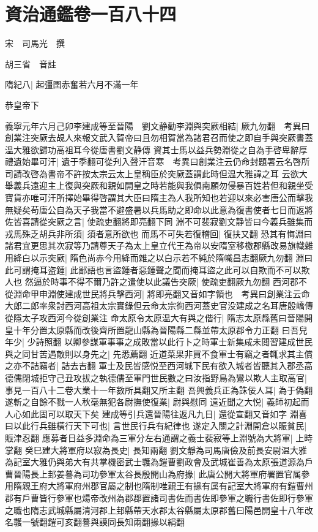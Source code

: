 \chapter{資治通鑑卷一百八十四}
宋　司馬光　撰

胡三省　音註

隋紀八|{
	起彊圉赤奮若六月不滿一年}


恭皇帝下

義寧元年六月己卯李建成等至晉陽　劉文静勸李淵與突厥相結|{
	厥九勿翻　考異曰創業注突厥去覘人來報文武入賀帝曰且勿相賀當為諸君召而使之即自手與突厥書蓋温大雅欲歸功高祖耳今從唐書劉文静傳}
資其士馬以益兵勢淵從之自為手啓卑辭厚禮遺始畢可汗|{
	遺于季翻可從刋入聲汗音寒　考異曰創業注云仍命封題署云名啓所司請改啓為書帝不許按太宗云太上皇稱臣於突厥蓋謂此時但温大雅諱之耳}
云欲大舉義兵遠迎主上復與突厥和親如開皇之時若能與我俱南願勿侵暴百姓若但和親坐受寶貨亦唯可汗所擇始畢得啓謂其大臣曰隋主為人我所知也若迎以來必害唐公而擊我無疑矣苟唐公自為天子我當不避盛暑以兵馬助之即命以此意為復書使者七日而返將佐皆喜請從突厥之言|{
	使疏吏翻將即亮翻下同}
淵不可裴寂劉文静皆曰今義兵雖集而戎馬殊乏胡兵非所須|{
	須者意所欲也}
而馬不可失若復稽回|{
	復扶又翻}
恐其有悔淵曰諸君宜更思其次寂等乃請尊天子為太上皇立代王為帝以安隋室移檄郡縣改易旗幟雜用絳白以示突厥|{
	隋色尚赤今用絳而雜之以白示若不純於隋幟昌志翻厥九勿翻}
淵曰此可謂掩耳盗鍾|{
	此鄙語也言盜鍾者惡鍾聲之聞而掩耳盜之此可以自欺而不可以欺人也}
然逼於時事不得不爾乃許之遣使以此議告突厥|{
	使疏吏翻厥九勿翻}
西河郡不從淵命甲申淵使建成世民將兵擊西河|{
	將即亮翻又音如字領也　考異曰創業注云命大郎二郎率衆討西河高祖太宗實錄但云命太宗徇西河蓋史官没建成之名耳唐殷嶠傳從隱太子攻西河今從創業注}
命太原令太原温大有與之偕行|{
	隋志太原縣舊曰晉陽開皇十年分置太原縣而改後齊所置龍山縣為晉陽縣二縣並帶太原郡令力正翻}
曰吾兒年少|{
	少詩照翻}
以卿參謀軍事事之成敗當以此行卜之時軍士新集咸未閲習建成世民與之同甘苦遇敵則以身先之|{
	先悉薦翻}
近道菜果非買不食軍士有竊之者輒求其主償之亦不詰竊者|{
	詰去吉翻}
軍士及民皆感悦至西河城下民有欲入城者皆聽其入郡丞高德儒閉城拒守己丑攻拔之執德儒至軍門世民數之曰汝指野鳥為鸞以欺人主取高官|{
	事見一百八十二卷大業十一年數所具翻又所主翻}
吾興義兵正為誅佞人耳|{
	為于偽翻}
遂斬之自餘不戮一人秋毫無犯各尉撫使復業|{
	尉與慰同}
遠近聞之大悦|{
	義師初起而人心如此固可以取天下矣}
建成等引兵還晉陽往返凡九日|{
	還從宣翻又音如字}
淵喜曰以此行兵雖橫行天下可也|{
	言世民行兵有紀律也}
遂定入關之計淵開倉以賑貧民|{
	賑津忍翻}
應募者日益多淵命為三軍分左右通謂之義士裴寂等上淵號為大將軍|{
	上時掌翻}
癸巳建大將軍府以寂為長史|{
	長知兩翻}
劉文靜為司馬唐儉及前長安尉温大雅為記室大雅仍與弟大有共掌機密武士彠為鎧曹劉政會及武城崔善為太原張道源為戶曹晉陽長上邽姜謩為司功參軍太谷長殷開山為府掾|{
	此唐公開大將軍府署置官属參用隋親王府大將軍府州郡官屬之制也隋制唯親王有掾有属有記室大將軍府有鎧曹州郡有戶曹皆行參軍也煬帝改州為郡郡置諸司書佐而書佐即參軍之職行書佐即行參軍之職也隋志武城縣屬清河郡上邽縣帶天水郡太谷縣屬太原郡舊曰陽邑開皇十八年改名彠一虢翻鎧可亥翻謩與謨同長知兩翻掾以絹翻}
